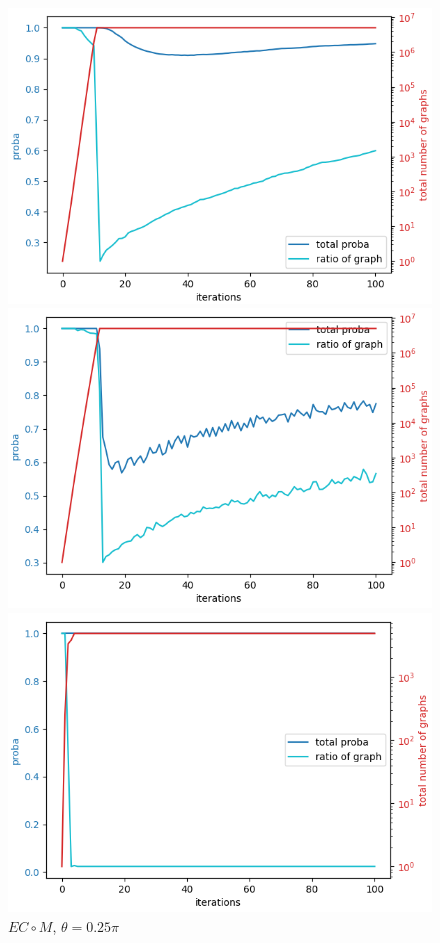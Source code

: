 \documentclass[11pts,french]{article}
\begin{document}
\begin{figure}[h!]
\begin{minipage}{0.33\textwidth}
\centering
\includegraphics[width=\textwidth, height=0.66\textwidth]{stats/0_split_merge_move}
\caption{$SM\circ M$, $\theta=0.375\pi$}
\end{minipage}
\begin{minipage}{0.33\textwidth}
\centering
\includegraphics[width=\textwidth, height=0.66\textwidth]{stats/1_split_merge_move}
\caption{$SM\circ M$, $\theta=0.25\pi$}
\end{minipage}
\begin{minipage}{0.33\textwidth}
\centering
\includegraphics[width=\textwidth, height=0.66\textwidth]{stats/2_erase_create_move}
\caption{$EC\circ M$, $\theta=0.25\pi$}
\end{minipage}


\end{figure}
\end{document}
